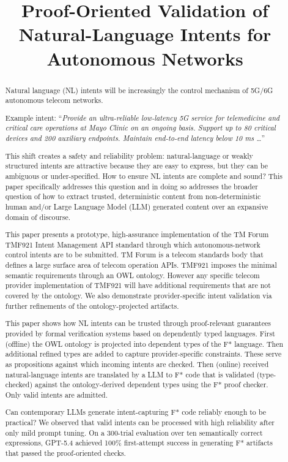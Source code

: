 \documentclass[conference]{IEEEtran}
\begin{document}
\title{Proof-Oriented Validation of Natural-Language Intents for Autonomous Networks}

\author{}

\maketitle

\begin{abstract}
Natural language (NL) intents will be increasingly the control mechanism of 5G/6G autonomous telecom networks.

Example intent: ``\textit{Provide an ultra-reliable low-latency 5G service for telemedicine and critical care operations at Mayo Clinic on an ongoing basis. Support up to 80 critical devices and 200 auxiliary endpoints. Maintain end-to-end latency below 10 ms \ldots}''

This shift creates a safety and reliability problem: natural-language or weakly structured intents are attractive because they are easy to express, but they can be ambiguous or under-specified. How to ensure NL intents are complete and sound? This paper specifically addresses this question and in doing so addresses the broader question of how to extract trusted, deterministic content from non-deterministic human and/or Large Language Model (LLM) generated content over an expansive domain of discourse.

This paper presents a prototype, high-assurance implementation of the TM Forum TMF921 Intent Management API standard through which autonomous-network control intents are to be submitted. TM Forum is a telecom standards body that defines a large surface area of telecom operation APIs. TMF921 imposes the minimal semantic requirements through an OWL ontology. However any specific telecom provider implementation of TMF921 will have additional requirements that are not covered by the ontology. We also demonstrate provider-specific intent validation via further refinements of the ontology-projected artifacts.

This paper shows how NL intents can be trusted through proof-relevant guarantees provided by formal verification systems based on dependently typed languages. First (offline) the OWL ontology is projected into dependent types of the F* language. Then additional refined types are added to capture provider-specific constraints. These serve as propositions against which incoming intents are checked. Then (online) received natural-language intents are translated by a LLM to F* code that is validated (type-checked) against the ontology-derived dependent types using the F* proof checker. Only valid intents are admitted.

Can contemporary LLMs generate intent-capturing F* code reliably enough to be practical? We observed that valid intents can be processed with high reliability after only mild prompt tuning. On a 300-trial evaluation over ten semantically correct expressions, GPT-5.4 achieved 100\% first-attempt success in generating F* artifacts that passed the proof-oriented checks.
\end{abstract}
\end{document}
